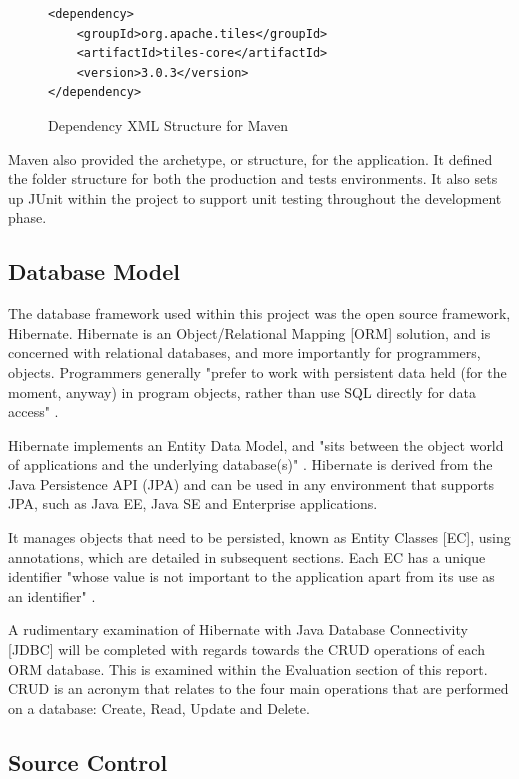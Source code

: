 \begin{figure}[H]
\begin{lstlisting}
<dependency>
	<groupId>org.apache.tiles</groupId>
	<artifactId>tiles-core</artifactId>
	<version>3.0.3</version>
</dependency>
\end{lstlisting}
\caption{Dependency XML Structure for Maven}
\end{figure}

Maven also provided the archetype, or structure, for the application. It defined the folder structure for both the production and tests environments. It also sets up JUnit within the project to support unit testing throughout the development phase.

\subsection{Database Model}

The database framework used within this project was the open source framework, Hibernate. Hibernate is an Object/Relational Mapping [ORM] solution, and is concerned with relational databases, and more importantly for programmers, objects. Programmers generally "prefer to work with persistent data held (for the moment, anyway) in program objects, rather than use SQL directly for data access" \parencite{bauer2005hibernate}. 

Hibernate implements an Entity Data Model, and "sits between the object world of applications and the underlying database(s)" \parencite{bauer2005hibernate}. Hibernate is derived from the Java Persistence API (JPA) and can be used in any environment that supports JPA, such as Java EE, Java SE and Enterprise applications.

It manages objects that need to be persisted, known as Entity Classes [EC], using annotations, which are detailed in subsequent sections. Each EC has a unique identifier "whose value is not important to the application apart from its use as an identifier" \parencite{bauer2005hibernate}. 

A rudimentary examination of Hibernate with Java Database Connectivity [JDBC] will be completed with regards towards the CRUD operations of each ORM database. This is examined within the Evaluation section of this report. CRUD is an acronym that relates to the four main operations that are performed on a database: Create, Read, Update and Delete.



\subsection{Source Control}

